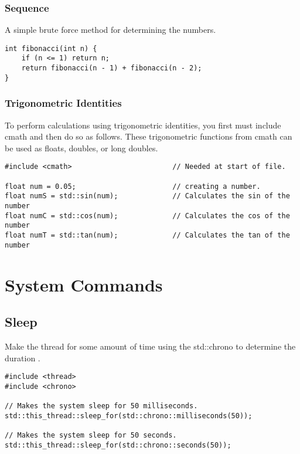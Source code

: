 \subsubsection{ Sequence}

A simple brute force method for determining the  numbers.
\begin{lstlisting}
int fibonacci(int n) {
    if (n <= 1) return n;
    return fibonacci(n - 1) + fibonacci(n - 2);
}
\end{lstlisting}





\subsubsection{Trigonometric Identities}

To perform calculations using trigonometric identities, you first must include cmath and then do so as follows. These trigonometric functions from cmath can be used as floats, doubles, or long doubles.
\begin{lstlisting}
#include <cmath>                        // Needed at start of file.

float num = 0.05;                       // creating a number.
float numS = std::sin(num);             // Calculates the sin of the number
float numC = std::cos(num);             // Calculates the cos of the number
float numT = std::tan(num);             // Calculates the tan of the number
\end{lstlisting}













\section{System Commands}

\subsection*{Sleep}
Make the thread  for some amount of time using the std::chrono to determine the duration \cite{cpp:chrono}.
\begin{lstlisting}
#include <thread>
#include <chrono>

// Makes the system sleep for 50 milliseconds.
std::this_thread::sleep_for(std::chrono::milliseconds(50));

// Makes the system sleep for 50 seconds.
std::this_thread::sleep_for(std::chrono::seconds(50)); 
\end{lstlisting}

